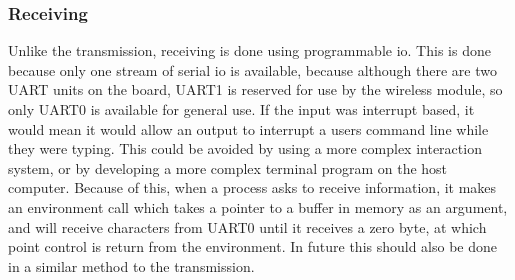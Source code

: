 \subsubsection{Receiving}
Unlike the transmission, receiving is done using programmable \ac{io}. This is done because only one stream of serial \ac{io} is available, because although there are two UART units on the board, UART1 is reserved for use by the wireless module, so only UART0 is available for general use. If the input was interrupt based, it would mean it would allow an output to interrupt a users command line while they were typing. This could be avoided by using a more complex interaction system, or by developing a more complex terminal program on the host computer. Because of this, when a process asks to receive information, it makes an environment call which takes a pointer to a buffer in memory as an argument, and will receive characters from UART0 until it receives a zero byte, at which point control is return from the environment. In future this should also be done in a similar method to the transmission.
